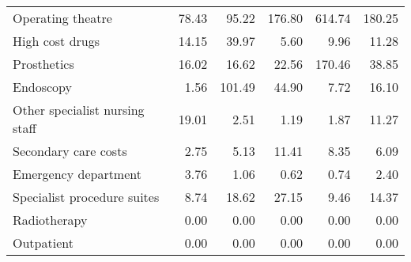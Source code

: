 \begin{tabular}{lrrrrr}
Operating theatre              &    78.43 &    95.22 &   176.80 &   614.74 &     180.25 \\
High cost drugs                &    14.15 &    39.97 &     5.60 &     9.96 &      11.28 \\
Prosthetics                    &    16.02 &    16.62 &    22.56 &   170.46 &      38.85 \\
Endoscopy                      &     1.56 &   101.49 &    44.90 &     7.72 &      16.10 \\
Other specialist nursing staff &    19.01 &     2.51 &     1.19 &     1.87 &      11.27 \\
Secondary care costs           &     2.75 &     5.13 &    11.41 &     8.35 &       6.09 \\
Emergency department           &     3.76 &     1.06 &     0.62 &     0.74 &       2.40 \\
Specialist procedure suites    &     8.74 &    18.62 &    27.15 &     9.46 &      14.37 \\
Radiotherapy                   &     0.00 &     0.00 &     0.00 &     0.00 &       0.00 \\
Outpatient                     &     0.00 &     0.00 &     0.00 &     0.00 &       0.00 \\
\bottomrule
\end{tabular}
